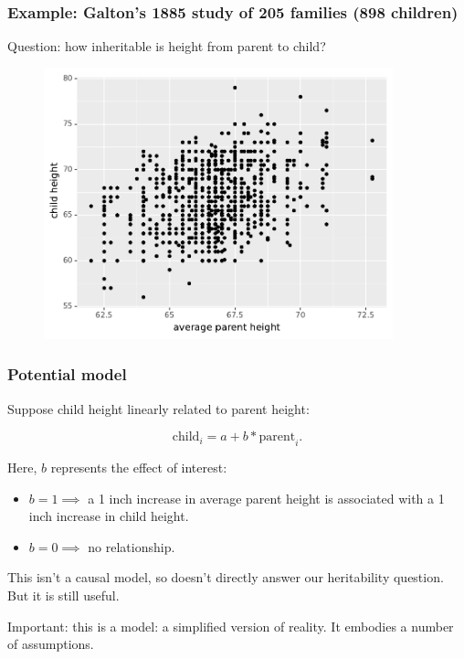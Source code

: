 \documentclass[handout]{beamer}
\begin{document}
\begin{frame}
	\frametitle{Example: Galton's 1885 study of 205 families (898 children)}
	
	Question: how inheritable is height from parent to child?
	
		\begin{figure}[ht]
			\centerline{\includegraphics[width=0.9\textwidth]{../figures/galton_raw.pdf}}
		\end{figure}
	
\end{frame}

\begin{frame}
	\frametitle{Potential model}
	
	Suppose child height linearly related to parent height:
	
	\begin{equation}
	\text{child}_i = a + b * \text{parent}_i.
	\end{equation}
	
	Here, $b$ represents the effect of interest:
	
	\begin{itemize}
		\item $b=1 \implies$ a 1 inch increase in average parent height is associated with a 1 inch increase in child height.
		\item $b=0 \implies$ no relationship.
	\end{itemize}
	
	This isn't a causal model, so doesn't directly answer our heritability question. But it is still useful.
	
	\vspace{0.5cm}
	
	Important: this is a model: a simplified version of reality. It embodies a number of assumptions.
	
\end{frame}
\end{document}
